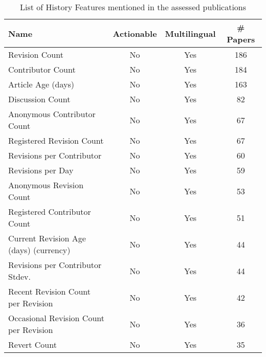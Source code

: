 \begin{table}[htbp]
    \caption{List of History Features mentioned in the assessed publications}
    \label{tab:feat_History}
    \centering
    \begin{tabular}{m{} c c c}
        \toprule
        \textbf{Name} & \textbf{Actionable} & \textbf{Multilingual} & \textbf{\# Papers} \\ 
        \midrule
        Revision Count & No & Yes & 186 \\
        Contributor Count & No & Yes & 184 \\
        Article Age (days) & No & Yes & 163 \\
        Discussion Count & No & Yes & 82 \\
        Anonymous Contributor Count & No & Yes & 67 \\
        Registered Revision Count & No & Yes & 67 \\
        Revisions per Contributor & No & Yes & 60 \\
        Revisions per Day & No & Yes & 59 \\
        Anonymous Revision Count & No & Yes & 53 \\
        Registered Contributor Count & No & Yes & 51 \\
        Current Revision Age (days) (currency) & No & Yes & 44 \\
        Revisions per Contributor Stdev. & No & Yes & 44 \\
        Recent Revision Count per Revision & No & Yes & 42 \\
        Occasional Revision Count per Revision  & No & Yes & 36 \\
        Revert Count & No & Yes & 35 \\
        \bottomrule
    \end{tabular}
\end{table}